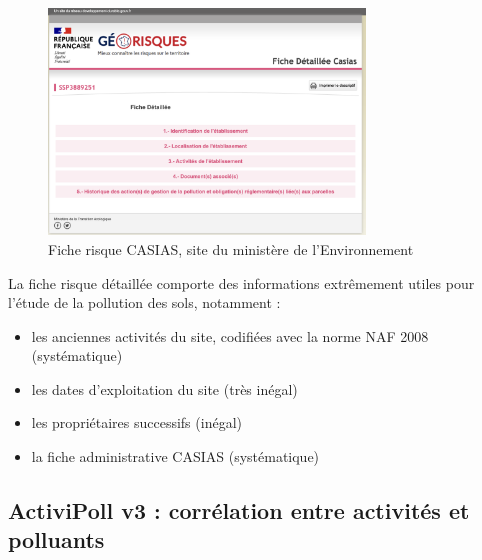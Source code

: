 \documentclass[a4paper,twoside,12pt]{book}
\begin{document}
\begin{figure}[!h]
\centering 
\includegraphics[width=0.75\textwidth]{img/chapitre3/Capture_Fiche_Riques_CASIAS}
\caption{Fiche risque CASIAS, site du ministère de l'Environnement}
\end{figure}

La fiche risque détaillée comporte des informations extrêmement utiles pour l'étude de la pollution des sols, notamment : 

\begin{itemize}
    \item les anciennes activités du site, codifiées avec la norme NAF 2008 (systématique)
    \item les dates d'exploitation du site (très inégal)
    \item  les propriétaires successifs (inégal)
    \item  la fiche administrative CASIAS (systématique)
\end{itemize}

\subsection{ActiviPoll v3 : corrélation entre activités et polluants}
\end{document}
